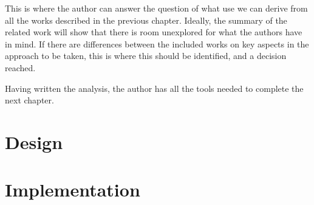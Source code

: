 \documentclass[ twoside,openright,titlepage,numbers=noenddot,headinclude,%
                footinclude=true,cleardoublepage=empty,abstractoff, %
                BCOR=5mm,paper=a4,fontsize=11pt,%
                ngerman,american,%
                ]{scrreprt}
\begin{document}
This is where the author can answer the question of what use we can
derive from all the works described in the previous chapter. Ideally,
the summary of the related work will show that there is room
unexplored for what the authors have in mind. If there are differences
between the included works on key aspects in the approach to be taken,
this is where this should be identified, and a decision reached.

Having written the analysis, the author has all the tools needed to
complete the next chapter.


\chapter{Design}
\label{cha:design}

%
%





\chapter{Implementation}
\label{cha:implementation}


\end{document}
